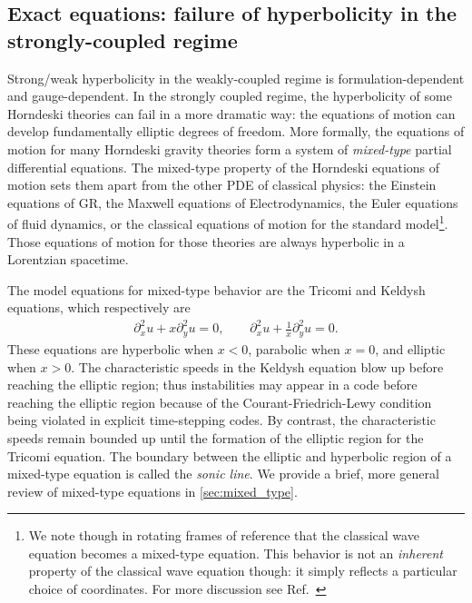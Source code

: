 \documentclass{ws-ijmpd}
\begin{document}
\subsection{Exact equations:
failure of hyperbolicity in the strongly-coupled regime
\label{sec:failure_strong_hyperbolicity}
}
Strong/weak hyperbolicity in the weakly-coupled regime is 
formulation-dependent and gauge-dependent.
In the strongly coupled regime, 
the hyperbolicity of some Horndeski theories can fail in a more
dramatic way: the equations of motion can develop fundamentally
elliptic degrees of freedom.
More formally, the equations of motion for many Horndeski gravity theories
form a system of \emph{mixed-type} 
partial differential equations.
The mixed-type property of the Horndeski equations of motion sets
them apart from the other PDE of classical physics: the
Einstein equations of GR, the Maxwell equations of
Electrodynamics, the Euler equations of fluid dynamics,
or the classical equations of motion for
the standard model\footnote{We note though in rotating frames of reference
that the classical wave equation becomes a mixed-type equation.
This behavior is not an \emph{inherent} property of the classical wave
equation though: it simply reflects a particular choice of coordinates.
For more discussion see Ref.~}.
Those equations of motion for those
theories are always hyperbolic in a Lorentzian spacetime.

The model equations for mixed-type behavior are the 
Tricomi and Keldysh equations\cite{https://doi.org/10.1002/cpa.3160230404,chen2015tricomi}, 
which respectively are
\begin{align}
   \partial_x^2u
   +
   x
   \partial_y^2u
   =
   0
   ,\qquad
   \partial_x^2u
   +
   \frac{1}{x}
   \partial_y^2u
   =
   0
   .
\end{align}
These equations are hyperbolic when $x<0$, 
parabolic when $x=0$, and elliptic when $x>0$.
The characteristic speeds in the Keldysh equation
blow up before reaching the elliptic region; thus instabilities may appear 
in a code before reaching the elliptic region because of the 
Courant-Friedrich-Lewy condition being violated in explicit time-stepping codes.
By contrast, the characteristic speeds remain bounded
up until the formation of the elliptic region for the Tricomi equation.
The boundary between the elliptic and hyperbolic region of a mixed-type
equation is called the \emph{sonic line}\cite{rassias1990lecture,otway2015elliptic}.
We provide a brief, more general review of mixed-type equations in 
\ref{sec:mixed_type}.
\end{document}
